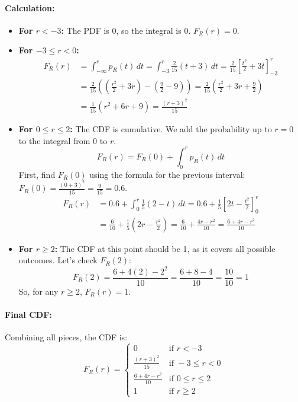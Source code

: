 \documentclass[11pt,a4paper]{article}
\begin{document}
\paragraph{Calculation:}
\begin{itemize}
    \item \textbf{For $r < -3$:} The PDF is 0, so the integral is 0. $F_R(r) = 0$.
    \item \textbf{For $-3 \le r < 0$:}
    \begin{align*}
        F_R(r) &= \int_{-\infty}^{r} p_R(t) \,dt = \int_{-3}^{r} \frac{2}{15}(t+3) \,dt = \frac{2}{15} \left[ \frac{t^2}{2} + 3t \right]_{-3}^{r} \\
        &= \frac{2}{15} \left( \left(\frac{r^2}{2} + 3r\right) - \left(\frac{9}{2} - 9\right) \right) = \frac{2}{15} \left( \frac{r^2}{2} + 3r + \frac{9}{2} \right) \\
        &= \frac{1}{15} (r^2 + 6r + 9) = \frac{(r+3)^2}{15}
    \end{align*}
    \item \textbf{For $0 \le r \le 2$:} The CDF is cumulative. We add the probability up to $r=0$ to the integral from $0$ to $r$.
    \[ F_R(r) = F_R(0) + \int_{0}^{r} p_R(t) \,dt \]
    First, find $F_R(0)$ using the formula for the previous interval: $F_R(0) = \frac{(0+3)^2}{15} = \frac{9}{15} = 0.6$.
    \begin{align*}
        F_R(r) &= 0.6 + \int_{0}^{r} \frac{1}{5}(2-t) \,dt = 0.6 + \frac{1}{5} \left[ 2t - \frac{t^2}{2} \right]_{0}^{r} \\
        &= \frac{6}{10} + \frac{1}{5} \left( 2r - \frac{r^2}{2} \right) = \frac{6}{10} + \frac{4r - r^2}{10} = \frac{6+4r-r^2}{10}
    \end{align*}
    \item \textbf{For $r \ge 2$:} The CDF at this point should be 1, as it covers all possible outcomes. Let's check $F_R(2)$:
    \[ F_R(2) = \frac{6+4(2)-2^2}{10} = \frac{6+8-4}{10} = \frac{10}{10} = 1 \]
    So, for any $r \ge 2$, $F_R(r)=1$.
\end{itemize}
\paragraph{Final CDF:}
Combining all pieces, the CDF is:
\[
F_R(r) =
\begin{cases}
    0 & \text{if } r < -3 \\
    \frac{(r+3)^2}{15} & \text{if } -3 \le r < 0 \\
    \frac{6+4r-r^2}{10} & \text{if } 0 \le r \le 2 \\
    1 & \text{if } r \ge 2
\end{cases}
\]
\end{document}
